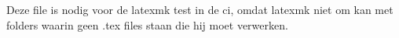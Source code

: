\documentclass{ximera}
\begin{document}
Deze file is nodig voor de latexmk test in de ci, omdat latexmk niet om kan met folders waarin geen .tex files staan die hij moet verwerken.
\end{document}
